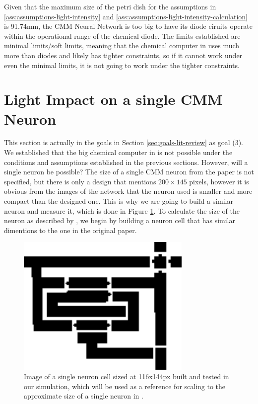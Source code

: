 Given that the maximum size of the petri dish for the assumptions in \ref{ass:assumptions-light-intensity} and \ref{ass:assumptions-light-intensity-calculation} is 91.74mm, the CMM Neural Network is too big to 
have its diode ciruits operate within the operational range of the chemical diode. 
The limits established are minimal limits/soft limits, meaning that the chemical computer in \cite{stovold2017reaction} uses much more than diodes and 
likely has tighter constraints, so if it cannot work under even the minimal limits, it is not going to work under the tighter constraints. 
    

\section{Light Impact on a single CMM Neuron \citep{stovold2017reaction}} \label{sec:light-impact-cmm-neuron-single}
This section is actually in the goals in Section \ref{sec:goals-lit-review} as goal (3).
We established that the big chemical computer in \cite{stovold2017reaction} is not possible under the conditions and assumptions established in the previous sections.
However, will a single neuron be possible? 
The size of a single CMM neuron from the paper is not specified, but there is only a design that mentions $200 \times 145$ pixels, however it is 
obvious from the images of the network that the neuron used is smaller and more compact than the designed one. This is why we are going to build a similar neuron
and measure it, which is done in Figure \ref{fig:neuron-cell-built}.
To calculate the size of the neuron as described by \cite{stovold2017reaction}, we begin by building a neuron cell 
that has similar dimentions to the one in the original paper.

\begin{figure}[h]
    \centering
    \includegraphics[width=0.75\textwidth]{images/circuit2-Recovered.png}
    \caption{Image of a single neuron cell sized at 116x144px built and tested in our simulation, which will be used as a reference for scaling to the approximate size of a single neuron in \cite{stovold2017reaction}.}
    \label{fig:neuron-cell-built}
\end{figure}


